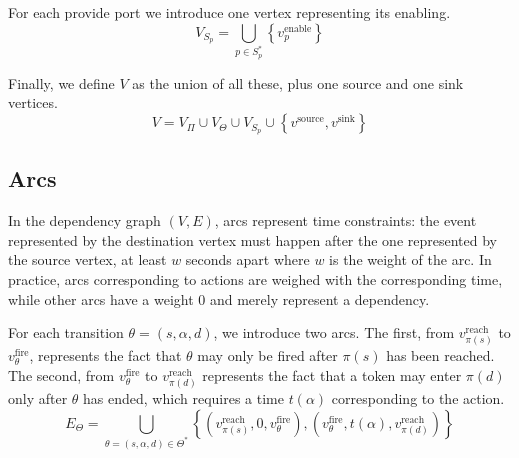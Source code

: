 
For each provide port we introduce one vertex representing its
enabling.
\[
V_{S_p}=\bigcup_{p\in S_p^*} \left\{ v_p^\text{enable}\right\} 
\]

Finally, we define $V$ as the union of all these, plus one source
and one sink vertices. 
\[
V=V_{\Pi}\cup V_{\Theta} \cup V_{S_p} \cup \left\{ v^\text{source},v^\text{sink}\right\} 
\]

\subsection{Arcs}

In the dependency graph $\left(V,E\right)$, arcs represent time constraints: the event represented by the destination vertex must happen after the one represented by the source vertex, at least $w$ seconds apart where $w$ is the weight of the arc. In practice, arcs corresponding to actions are weighed with the corresponding time, while other arcs have a weight 0 and merely represent a dependency.


%

For each transition $\theta = (s, \alpha, d)$, we introduce
two arcs.
%
The first, from $v_{\pi(s)}^\text{reach}$
to $v_\theta^\text{fire}$, represents the fact that $\theta$ may only
be fired after $\pi(s)$ has been reached.
%
The second, from $v_\theta^\text{fire}$ to $v_{\pi(d)}^\text{reach}$
represents the fact that a token may enter $\pi(d)$ only after
$\theta$ has ended, which requires a time $t(\alpha)$ corresponding
to the action.
\[
E_\Theta = \bigcup_{\theta=(s,\alpha,d)\in\Theta^*} \left\{ \left(v_{\pi(s)}^\text{reach},0,v_\theta^\text{fire}\right), \left(v_\theta^\text{fire},t(\alpha),v_{\pi(d)}^\text{reach}\right)\right\} 
\]


